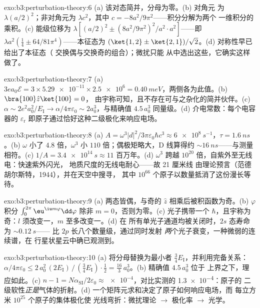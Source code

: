 \begin{solution}{exo:b3:perturbation-theory:6}
(a) 该对态简并，分母为零。(b) 对角元
为 $\lambda(a/2)^2$；非对角元为 $\lambda c^2$，其中 $c =
-8a^2/9\pi^2$——积分分解为两个
一维积分的乘积。(c) 能级位移为 $\lambda[(a/2)^2 \pm
(8a^2/9\pi^2)^2/a^2\cdot a^2]$——即 $\lambda a^2(\tfrac14 \pm
64/81\pi^4)$——本征态为 $(\ket{1,2} \pm \ket{2,1})/
\sqrt2$。(d) 对称性早已给出了本征态（
交换偶与交换奇的组合）；微扰只能
从中选出这些，它确实这样做了。
\end{solution}

\begin{solution}{exo:b3:perturbation-theory:7}
(a) $3ea_0\mathcal E = 3 \times \num{5.29e-11} \times \num{2.5e6}
= \qty{0.40}{meV}$，两侧各为此值。(b) $\bra{100}\hat z\ket{100} = 0$，
由宇称可知，且不存在可与之杂化的简并伙伴。(c)
$\alpha \sim 2e^2a_0^2/E_{\text{I}} \to \alpha/4\pi\varepsilon_0
\sim 2a_0^3$，与精确值 $4.5\,a_0^3$ 同量级。(d)
介电常数：每个电容器的 $\varepsilon_{\text{r}}$
即原子通过恰好这种二级极化来响应电场。
\end{solution}

\begin{solution}{exo:b3:perturbation-theory:8}
(a) $A = \omega^3|d|^2/3\pi\varepsilon_0\hbar c^3 \approx
\qty{6e8}{s^{-1}}$，$\tau = \qty{1.6}{ns}$。(b) $\omega$ 小了
$4.8$ 倍，$\omega^3$ 小 $110$ 倍；偶极矩略大，D
线算得约 $\sim\qty{16}{ns}$——与测量相符。(c)
$1/A = \qty{3.4e14}{s} \approx 11$ 百万年。(d) $\omega^3$
跨越 $10^{20}$ 倍，自紫外至无线电：快速紫外闪光，
地质尺度的无线电耐心——故 21 厘米线
由理论预言（范德胡尔斯特，1944），并在天空中搜寻，
其中 $10^{66}$ 个原子以数量抵消了这份漫长等待。
\end{solution}

\begin{solution}{exo:b3:perturbation-theory:9}
(a) 两态皆偶，与奇的 $\hat z$ 相乘后被积函数为奇。(b)
$\varphi$ 积分 $\int_0^{2\pi}\eu^{\iu m\varphi}\dd\varphi$
除非 $m = 0$，否则为零。(c) 光子携带一个 $\hbar$，且宇称为
奇：$l$ 须改变一，$m$ 至多改变一。(d) 在
所有单光子通道均被关闭时，$2s$ 态寿命为 $\sim\qty{0.12}{s}$——
比 $2p$ 长八个数量级，通过同时发射
\emph{两}个光子衰变，一种微弱的连续谱，在
行星状星云中确已观测到。
\end{solution}

\begin{solution}{exo:b3:perturbation-theory:10}
(a) 将分母替换为最小者 $\tfrac34
E_{\text{I}}$，并利用完备关系：$\alpha/4\pi\varepsilon_0 \le
2\,a_0^2\,(2E_{\text{I}})\,/\,(\tfrac34 E_{\text{I}})\cdot\tfrac12
= \tfrac{16}3\,a_0^3$。(b) 精确值 $4.5\,a_0^3$ 位于
上界之下，理应如此。(c) $n - 1 = N\alpha_{\text{SI}}/2\varepsilon_0
\approx \num{e-4}$，对比实测的 \num{1.3e-4}：原子的
二级软性\emph{正是}气体的折射。(d)
一个矩阵元求和决定了原子如何响应电场，而
每立方米 $10^{25}$ 个原子的集体极化使
光线弯折：微扰理论 $\to$ 极化率 $\to$ 光学。
\end{solution}


